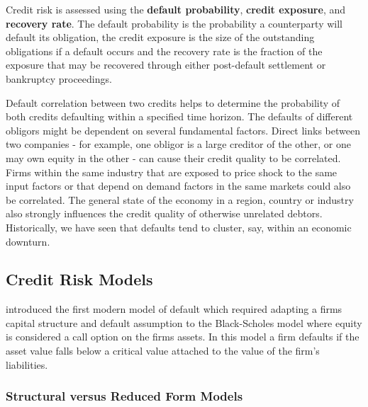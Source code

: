 \begin{definition}
\begin{rm}
Credit risk is assessed using the {\bf default probability}, {\bf credit exposure}, and {\bf recovery rate}. The default probability is the probability a counterparty will default its obligation, the credit exposure is the size of the outstanding obligations if a default occurs and the recovery rate is the fraction of the exposure that may be recovered through either post-default settlement or bankruptcy proceedings.
\end{rm}
\end{definition}

\begin{definition}
\begin{rm}
Default correlation between two credits helps to determine the probability of both credits defaulting within a specified time horizon. The defaults of different obligors might be dependent on several fundamental factors. Direct links between two companies - for example, one obligor is a large creditor of the other, or one may own equity in the other - can cause their credit quality to be correlated. Firms within the same industry that are exposed to price shock to the same input factors or that depend on demand factors in the same markets could also be correlated. The general state of the economy in a region, country or industry also strongly influences the credit quality of otherwise unrelated debtors. Historically, we have seen that defaults tend to cluster, say, within an economic downturn.
\end{rm}
\end{definition}


\subsection{Credit Risk Models}

\cite{mer1974} introduced the first modern model of default which required adapting a
firms capital structure and default assumption to the Black-Scholes model where equity
is considered a call option on the firms assets. In this model a firm defaults if the asset value falls below a critical value attached to the value of the firm's liabilities. 


\subsubsection{Structural versus Reduced Form Models}

